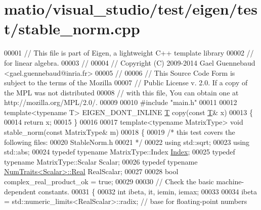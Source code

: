 \hypertarget{matio_2visual__studio_2test_2eigen_2test_2stable__norm_8cpp_source}{}\section{matio/visual\+\_\+studio/test/eigen/test/stable\+\_\+norm.cpp}
\label{matio_2visual__studio_2test_2eigen_2test_2stable__norm_8cpp_source}

\begin{DoxyCode}
00001 \textcolor{comment}{// This file is part of Eigen, a lightweight C++ template library}
00002 \textcolor{comment}{// for linear algebra.}
00003 \textcolor{comment}{//}
00004 \textcolor{comment}{// Copyright (C) 2009-2014 Gael Guennebaud <gael.guennebaud@inria.fr>}
00005 \textcolor{comment}{//}
00006 \textcolor{comment}{// This Source Code Form is subject to the terms of the Mozilla}
00007 \textcolor{comment}{// Public License v. 2.0. If a copy of the MPL was not distributed}
00008 \textcolor{comment}{// with this file, You can obtain one at http://mozilla.org/MPL/2.0/.}
00009 
00010 \textcolor{preprocessor}{#include "main.h"}
00011 
00012 \textcolor{keyword}{template}<\textcolor{keyword}{typename} T> EIGEN\_DONT\_INLINE \hyperlink{group___sparse_core___module}{T} copy(\textcolor{keyword}{const} \hyperlink{group___sparse_core___module}{T}& x)
00013 \{
00014   \textcolor{keywordflow}{return} x;
00015 \}
00016 
00017 \textcolor{keyword}{template}<\textcolor{keyword}{typename} MatrixType> \textcolor{keywordtype}{void} stable\_norm(\textcolor{keyword}{const} MatrixType& m)
00018 \{
00019   \textcolor{comment}{/* this test covers the following files:}
00020 \textcolor{comment}{     StableNorm.h}
00021 \textcolor{comment}{  */}
00022   \textcolor{keyword}{using} std::sqrt;
00023   \textcolor{keyword}{using} std::abs;
00024   \textcolor{keyword}{typedef} \textcolor{keyword}{typename} MatrixType::Index \hyperlink{namespace_eigen_a62e77e0933482dafde8fe197d9a2cfde}{Index};
00025   \textcolor{keyword}{typedef} \textcolor{keyword}{typename} MatrixType::Scalar Scalar;
00026   \textcolor{keyword}{typedef} \textcolor{keyword}{typename} \hyperlink{group___core___module_struct_eigen_1_1_num_traits}{NumTraits<Scalar>::Real} RealScalar;
00027   
00028   \textcolor{keywordtype}{bool} complex\_real\_product\_ok = \textcolor{keyword}{true};
00029 
00030   \textcolor{comment}{// Check the basic machine-dependent constants.}
00031   \{
00032     \textcolor{keywordtype}{int} ibeta, it, iemin, iemax;
00033 
00034     ibeta = std::numeric\_limits<RealScalar>::radix;         \textcolor{comment}{// base for floating-point numbers}

\end{DoxyCode}
